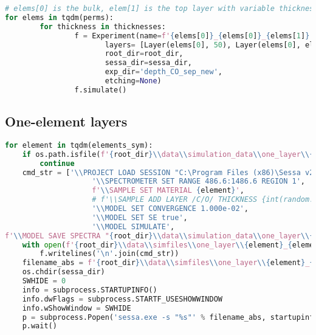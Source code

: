 \begin{lstlisting}[language=Python]
# elems[0] is the bulk, elem[1] is the top layer with variable thickness
for elems in tqdm(perms):
        for thickness in thicknesses:
                f = Experiment(name=f'{elems[0]}_{elems[0]}_{elems[1]}',
                       layers= [Layer(elems[0], 50), Layer(elems[0], elems[1])], 
                       root_dir=root_dir, 
                       sessa_dir=sessa_dir,
                       exp_dir='depth_CO_sep_new',
                       etching=None)
                f.simulate()
\end{lstlisting}


\hypertarget{one-element-layers}{%
\subsection*{One-element layers}\label{one-element-layers}}

\begin{lstlisting}[language=Python]
for element in tqdm(elements_sym):
    if os.path.isfile(f'{root_dir}\\data\\simulation_data\\one_layer\\{element}_{element}_spectra.spc'):
        continue
    cmd_str = ['\\PROJECT LOAD SESSION "C:\Program Files (x86)\Sessa v2.2.0\\bin/Sessa_ini.ses"',
                    '\\SPECTROMETER SET RANGE 486.6:1486.6 REGION 1',
                    f'\\SAMPLE SET MATERIAL {element}',
                    # f'\\SAMPLE ADD LAYER /C/O/ THICKNESS {int(random.triangular(12, 24, 15))} ABOVE 0',
                    '\\MODEL SET CONVERGENCE 1.000e-02',
                    '\\MODEL SET SE true',
                    '\\MODEL SIMULATE',
f'\\MODEL SAVE SPECTRA "{root_dir}\\data\\simulation_data\\one_layer\\{element}_{element}_spectra.spc"']
    with open(f'{root_dir}\\data\\simfiles\\one_layer\\{element}_{element}.txt', 'w') as f:
        f.writelines('\n'.join(cmd_str))
    filename_abs = f'{root_dir}\\data\\simfiles\\one_layer\\{element}_{element}.txt'
    os.chdir(sessa_dir)
    SWHIDE = 0
    info = subprocess.STARTUPINFO()
    info.dwFlags = subprocess.STARTF_USESHOWWINDOW
    info.wShowWindow = SWHIDE
    p = subprocess.Popen('sessa.exe -s "%s"' % filename_abs, startupinfo=info)
    p.wait()
\end{lstlisting}

